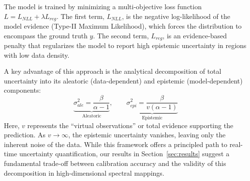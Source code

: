 The model is trained by minimizing a multi-objective loss function $L = L_{NLL} + \lambda L_{reg}$. The first term,
$L_{NLL}$, is the negative log-likelihood of the model evidence (Type-II Maximum Likelihood), which forces the
distribution to encompass the ground truth $y$. The second term, $L_{reg}$, is an evidence-based penalty that
regularizes the model to report high epistemic uncertainty in regions with low data density.

A key advantage of this approach is the analytical decomposition of total uncertainty into its aleatoric
(data-dependent) and epistemic (model-dependent) components:
\begin{equation}
    \underbrace{\sigma_{ale}^2 = \frac{\beta}{\alpha - 1}}_{\text{Aleatoric}}, \quad \quad \underbrace{\sigma_{epi}^2 = \frac{\beta}{v(\alpha - 1)}}_{\text{Epistemic}}
\end{equation}
Here, $v$ represents the ``virtual observations'' or total evidence supporting the prediction. As $v \to \infty$,
the epistemic uncertainty vanishes, leaving only the inherent noise of the data. While this framework offers a
principled path to real-time uncertainty quantification, our results in Section~\ref{sec:results} suggest a
fundamental trade-off between calibration accuracy and the validity of this decomposition in high-dimensional
spectral mappings.

